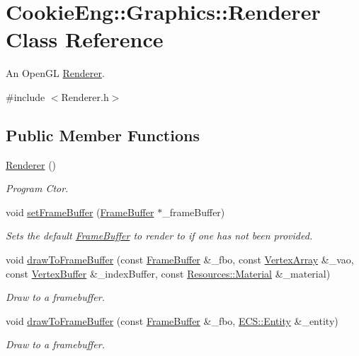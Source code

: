 \hypertarget{class_cookie_eng_1_1_graphics_1_1_renderer}{}\section{Cookie\+Eng\+:\+:Graphics\+:\+:Renderer Class Reference}
\label{class_cookie_eng_1_1_graphics_1_1_renderer}


An Open\+GL \hyperlink{class_cookie_eng_1_1_graphics_1_1_renderer}{Renderer}.  




{\ttfamily \#include $<$Renderer.\+h$>$}

\subsection*{Public Member Functions}
\begin{DoxyCompactItemize}
\item 
\hyperlink{class_cookie_eng_1_1_graphics_1_1_renderer_a255e78964e0d0ff7efd26e60a6612f39}{Renderer} ()
\begin{DoxyCompactList}\small\item\em Program Ctor. \end{DoxyCompactList}\item 
void \hyperlink{class_cookie_eng_1_1_graphics_1_1_renderer_a9e8bce3cb731b1f09ca5bc4bc863414b}{set\+Frame\+Buffer} (\hyperlink{class_cookie_eng_1_1_graphics_1_1_frame_buffer}{Frame\+Buffer} $\ast$\+\_\+frame\+Buffer)
\begin{DoxyCompactList}\small\item\em Sets the default \hyperlink{class_cookie_eng_1_1_graphics_1_1_frame_buffer}{Frame\+Buffer} to render to if one has not been provided. \end{DoxyCompactList}\item 
void \hyperlink{class_cookie_eng_1_1_graphics_1_1_renderer_aa32e62971f191a434ab457f9ac84ac31}{draw\+To\+Frame\+Buffer} (const \hyperlink{class_cookie_eng_1_1_graphics_1_1_frame_buffer}{Frame\+Buffer} \&\+\_\+fbo, const \hyperlink{class_cookie_eng_1_1_graphics_1_1_vertex_array}{Vertex\+Array} \&\+\_\+vao, const \hyperlink{class_cookie_eng_1_1_graphics_1_1_vertex_buffer}{Vertex\+Buffer} \&\+\_\+index\+Buffer, const \hyperlink{class_cookie_eng_1_1_resources_1_1_material}{Resources\+::\+Material} \&\+\_\+material)
\begin{DoxyCompactList}\small\item\em Draw to a framebuffer. \end{DoxyCompactList}\item 
void \hyperlink{class_cookie_eng_1_1_graphics_1_1_renderer_a8ce19d76df0b4353a76d2116340b8024}{draw\+To\+Frame\+Buffer} (const \hyperlink{class_cookie_eng_1_1_graphics_1_1_frame_buffer}{Frame\+Buffer} \&\+\_\+fbo, \hyperlink{class_cookie_eng_1_1_e_c_s_1_1_entity}{E\+C\+S\+::\+Entity} \&\+\_\+entity)
\begin{DoxyCompactList}\small\item\em Draw to a framebuffer. \end{DoxyCompactList}\end{DoxyCompactItemize}
